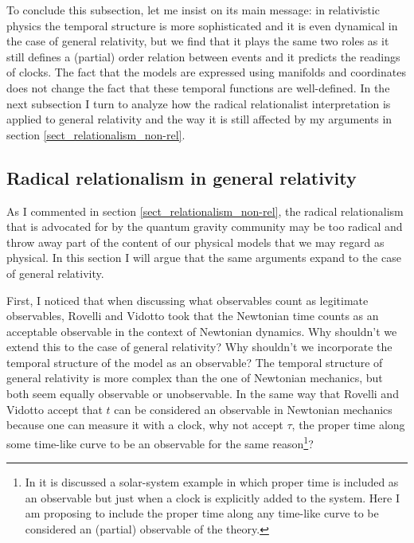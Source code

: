 \documentclass[12 pt]{article}
\begin{document}
To conclude this subsection, let me insist on its main message: in relativistic physics the temporal structure is more sophisticated and it is even dynamical in the case of general relativity, but we find that it plays the same two roles as it still defines a (partial) order relation between events and it predicts the readings of clocks. The fact that the models are expressed using manifolds and coordinates does not change the fact that these temporal functions are well-defined. In the next subsection I turn to analyze how the radical relationalist interpretation is applied to general relativity and the way it is still affected by my arguments in section \ref{sect_relationalism_non-rel}.


\subsection{Radical relationalism in general relativity} \label{sect_relationalism_general_relativity}

As I commented in section \ref{sect_relationalism_non-rel}, the radical relationalism that is advocated for by the quantum gravity community may be too radical and throw away part of the content of our physical models that we may regard as physical. In this section I will argue that the same arguments expand to the case of general relativity.

First, I noticed that when discussing what observables count as legitimate observables, Rovelli and Vidotto took that the Newtonian time counts as an acceptable observable in the context of Newtonian dynamics. Why shouldn't we extend this to the case of general relativity? Why shouldn't we incorporate the temporal structure of the model as an observable? The temporal structure of general relativity is more complex than the one of Newtonian mechanics, but both seem equally observable or unobservable. In the same way that Rovelli and Vidotto accept that $t$ can be considered an observable in Newtonian mechanics because one can measure it with a clock, why not accept $\tau$, the proper time along some time-like curve to be an observable for the same reason\footnote{In \cite[pp. 51-52]{Rovelli2004} it is discussed a solar-system example in which proper time is included as an observable but just when a clock is explicitly added to the system. Here I am proposing to include the proper time along any time-like curve to be considered an (partial) observable of the theory.}?
\end{document}
